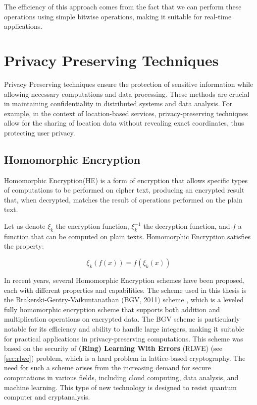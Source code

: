 The efficiency of this approach comes from the fact that we can perform these operations using simple bitwise operations, making it suitable for real-time applications.


\section{Privacy Preserving Techniques}
Privacy Preserving techniques ensure the protection of sensitive information while allowing necessary computations and data processing. These methods are crucial in maintaining confidentiality in distributed systems and data analysis. For example, in the context of location-based services, privacy-preserving techniques allow for the sharing of location data without revealing exact coordinates, thus protecting user privacy.

\subsection{Homomorphic Encryption}
Homomorphic Encryption(HE) is a form of encryption that allows specific types of computations to be performed on cipher text, producing an encrypted result that, when decrypted, matches the result of operations performed on the plain text.

Let us denote \( \xi_k \) the encryption function, \( \xi_k^{-1} \) the decryption function, and \( f \) a function that can be computed on plain texts. Homomorphic Encryption satisfies the property:

\[
    \xi_k(f(x)) = f(\xi_k(x))
\]

In recent years, several Homomorphic Encryption schemes have been proposed, each with different properties and capabilities. The scheme used in this thesis is the Brakerski-Gentry-Vaikuntanathan (BGV, 2011) scheme \cite{Brakerski2012-wj}, which is a leveled fully homomorphic encryption scheme that supports both addition and multiplication operations on encrypted data. The BGV scheme is particularly notable for its efficiency and ability to handle large integers, making it suitable for practical applications in privacy-preserving computations.
This scheme was based on the security of \textbf{(Ring) Learning With Errors} (RLWE) (see \cref{sec:rlwe}) problem, which is a hard problem in lattice-based cryptography. The need for such a scheme arises from the increasing demand for secure computations in various fields, including cloud computing, data analysis, and machine learning. This type of new technology is designed to resist quantum computer and cryptanalysis. 

